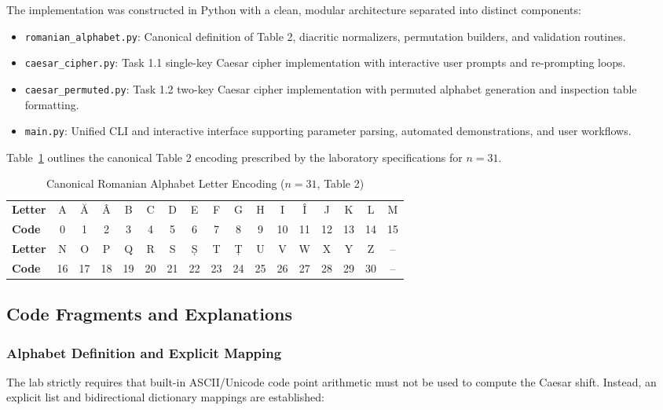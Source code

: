\documentclass{labreport}
\begin{document}
The implementation was constructed in Python with a clean, modular architecture separated into distinct components:
\begin{itemize}[noitemsep, topsep=2pt]
    \item \texttt{romanian\_alphabet.py}: Canonical definition of Table 2, diacritic normalizers, permutation builders, and validation routines.
    \item \texttt{caesar\_cipher.py}: Task 1.1 single-key Caesar cipher implementation with interactive user prompts and re-prompting loops.
    \item \texttt{caesar\_permuted.py}: Task 1.2 two-key Caesar cipher implementation with permuted alphabet generation and inspection table formatting.
    \item \texttt{main.py}: Unified CLI and interactive interface supporting parameter parsing, automated demonstrations, and user workflows.
\end{itemize}

Table~\ref{tab:romanian_alphabet} outlines the canonical Table 2 encoding prescribed by the laboratory specifications for $n = 31$.

\begin{table}[H]
\centering
\small
\caption{Canonical Romanian Alphabet Letter Encoding ($n = 31$, Table 2)}
\label{tab:romanian_alphabet}
\begin{tabular}{@{}l*{16}{c}@{}}
\toprule
\textbf{Letter} & A & Ă & Â & B & C & D & E & F & G & H & I & Î & J & K & L & M \\
\textbf{Code}   & 0 & 1 & 2 & 3 & 4 & 5 & 6 & 7 & 8 & 9 & 10 & 11 & 12 & 13 & 14 & 15 \\
\midrule
\textbf{Letter} & N & O & P & Q & R & S & Ș & T & Ț & U & V & W & X & Y & Z & -- \\
\textbf{Code}   & 16 & 17 & 18 & 19 & 20 & 21 & 22 & 23 & 24 & 25 & 26 & 27 & 28 & 29 & 30 & -- \\
\bottomrule
\end{tabular}
\end{table}

\subsection{Code Fragments and Explanations}

\subsubsection{Alphabet Definition and Explicit Mapping}
The lab strictly requires that built-in ASCII/Unicode code point arithmetic must not be used to compute the Caesar shift. Instead, an explicit list and bidirectional dictionary mappings are established:
\end{document}
